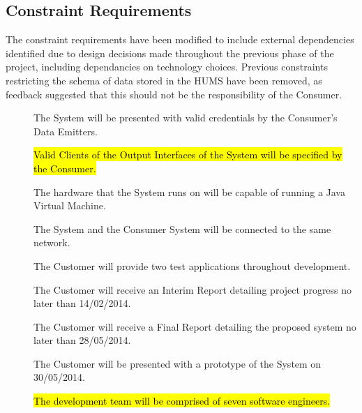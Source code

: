 \subsection{Constraint Requirements}
The constraint requirements have been modified to include external dependencies identified due to design decisions made throughout the previous phase of the project, including dependancies on technology choices. Previous constraints restricting the schema of data stored in the HUMS have been removed, as feedback suggested that this should not be the responsibility of the Consumer.
\begin{description}
	\item[] The System will be presented with valid credentials by the Consumer's Data Emitters.
	\item[] \hl{Valid Clients of the Output Interfaces of the System will be specified by the Consumer.}
	\item[] The hardware that the System runs on will be capable of running a Java Virtual Machine.
	\item[] The System and the Consumer System will be connected to the same network.
	\item[] The Customer will provide two test applications throughout development.
	\item[] The Customer will receive an Interim Report detailing project progress no later than 14/02/2014.
	\item[] The Customer will receive a Final Report detailing the proposed system no later than 28/05/2014. 
	\item[] The Customer will be presented with a prototype of the System on 30/05/2014.
	\item[] \hl{The development team will be comprised of seven software engineers.}
\end{description}

